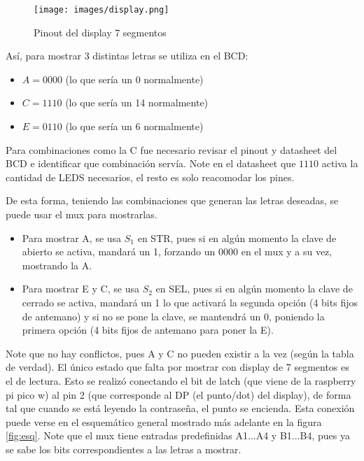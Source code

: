 \documentclass[conference]{IEEEtran}  %
\begin{document}
\begin{figure}[h!] %
    \centering    
    \texttt{[image: images/display.png]} %
    \caption{Pinout del display 7 segmentos \cite{XLITX_5621BS}}
    \label{fig:7seg}
\end{figure}

Así, para mostrar 3 distintas letras se utiliza en el BCD:

\begin{itemize}
    \item $ A = 0000 $ (lo que sería un 0 normalmente)
    \item $ C = 1110 $ (lo que sería un 14 normalmente)
    \item $ E = 0110 $ (lo que sería un 6 normalmente)
\end{itemize}

Para combinaciones como la C fue necesario revisar el pinout y datasheet del BCD e identificar que combinación servía. Note en el datasheet \cite{TI_SN74LS47} que $1110$ activa la cantidad de LEDS necesarios, el resto es solo reacomodar los pines. 

De esta forma, teniendo las combinaciones que generan las letras deseadas, se puede usar el mux para mostrarlas.

\begin{itemize}
    \item Para mostrar A, se usa $S_1$ en STR, pues si en algún momento la clave de abierto se activa, mandará un 1, forzando un $0000$ en el mux y a su vez, mostrando la A.

    \item Para mostrar E y C, se usa $S_2$ en SEL, pues si en algún momento la clave de cerrado se activa, mandará un 1 lo que activará la segunda opción (4 bits fijos de antemano) y si no se pone la clave, se mantendrá un 0, poniendo la primera opción (4 bits fijos de antemano para poner la E).
    
\end{itemize}

Note que no hay conflictos, pues A y C no pueden existir a la vez (según la tabla de verdad). El único estado que falta por mostrar con display de 7 segmentos es el de lectura. Esto se realizó conectando el bit de latch (que viene de la raspberry pi pico w) al pin 2 (que corresponde al DP (el punto/dot) del display), de forma tal que cuando se está leyendo la contraseña, el punto se encienda. Esta conexión puede verse en el esquemático general mostrado más adelante en la figura \ref{fig:esq}. Note que el mux tiene entradas predefinidas A1...A4 y B1...B4, pues ya se sabe los bits correspondientes a las letras a mostrar.
\end{document}
